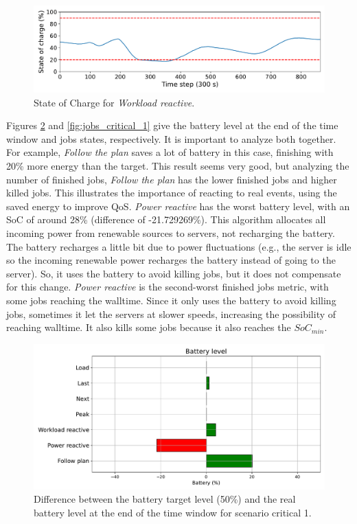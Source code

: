 \begin{figure}[!htb]
    \centering
    \includegraphics[scale=0.55]{Images/Compensations/critical_soc_s1.pdf}
    \caption{State of Charge for \emph{Workload reactive}.}
    \label{fig:DPM_soc}
\end{figure}

Figures \ref{fig:SoC_critical_1} and \ref{fig:jobs_critical_1} give the battery level at the end of the time window and jobs states, respectively. It is important to analyze both together. For example, \emph{Follow the plan} saves a lot of battery in this case, finishing with 20\% more energy than the target. This result seems very good, but analyzing the number of finished jobs, \emph{Follow the plan} has the lower finished jobs and higher killed jobs. This illustrates the importance of reacting to real events, using the saved energy to improve QoS. \emph{Power reactive} has the worst battery level, with an SoC of around 28\% (difference of -21.729269\%). This algorithm allocates all incoming power from renewable sources to servers, not recharging the battery. The battery recharges a little bit due to power fluctuations (e.g., the server is idle so the incoming renewable power recharges the battery instead of going to the server). So, it uses the battery to avoid killing jobs, but it does not compensate for this change. \emph{Power reactive} is the second-worst finished jobs metric, with some jobs reaching the walltime. Since it only uses the battery to avoid killing jobs, sometimes it let the servers at slower speeds, increasing the possibility of reaching walltime. It also kills some jobs because it also reaches the $SoC_{min}$.

\begin{figure}[!htb]
    \centering
    \includegraphics[scale=0.55]{Images/Compensations/battery_critical_1.pdf}
    \caption{Difference between the battery target level (50\%) and the real battery level at the end of the time window for scenario critical 1.}
    \label{fig:SoC_critical_1}
\end{figure}

